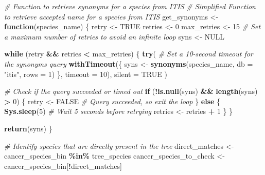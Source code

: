 \documentclass[
]{article}
\newenvironment{Shaded}{\begin{snugshade}}{\end{snugshade}}
\newcommand{\AttributeTok}[1]{\textcolor[rgb]{0.13,0.29,0.53}{#1}}
\newcommand{\CommentTok}[1]{\textcolor[rgb]{0.56,0.35,0.01}{\textit{#1}}}
\newcommand{\ConstantTok}[1]{\textcolor[rgb]{0.56,0.35,0.01}{#1}}
\newcommand{\ControlFlowTok}[1]{\textcolor[rgb]{0.13,0.29,0.53}{\textbf{#1}}}
\newcommand{\DecValTok}[1]{\textcolor[rgb]{0.00,0.00,0.81}{#1}}
\newcommand{\FunctionTok}[1]{\textcolor[rgb]{0.13,0.29,0.53}{\textbf{#1}}}
\newcommand{\NormalTok}[1]{#1}
\newcommand{\OtherTok}[1]{\textcolor[rgb]{0.56,0.35,0.01}{#1}}
\newcommand{\SpecialCharTok}[1]{\textcolor[rgb]{0.81,0.36,0.00}{\textbf{#1}}}
\newcommand{\StringTok}[1]{\textcolor[rgb]{0.31,0.60,0.02}{#1}}
\begin{document}
\begin{Shaded}
\begin{Highlighting}[]
\CommentTok{\# Function to retrieve synonyms for a species from ITIS}
\CommentTok{\# Simplified Function to retrieve accepted name for a species from ITIS}
\NormalTok{get\_synonyms }\OtherTok{\textless{}{-}} \ControlFlowTok{function}\NormalTok{(species\_name) \{}
\NormalTok{  retry }\OtherTok{\textless{}{-}} \ConstantTok{TRUE}
\NormalTok{  retries }\OtherTok{\textless{}{-}} \DecValTok{0}
\NormalTok{  max\_retries }\OtherTok{\textless{}{-}} \DecValTok{15}  \CommentTok{\# Set a maximum number of retries to avoid an infinite loop}
\NormalTok{  syns }\OtherTok{\textless{}{-}} \ConstantTok{NULL}
  
  \ControlFlowTok{while}\NormalTok{ (retry }\SpecialCharTok{\&\&}\NormalTok{ retries }\SpecialCharTok{\textless{}}\NormalTok{ max\_retries) \{}
    \FunctionTok{try}\NormalTok{(}
      \CommentTok{\# Set a 10{-}second timeout for the synonyms query}
      \FunctionTok{withTimeout}\NormalTok{(\{}
\NormalTok{        syns }\OtherTok{\textless{}{-}} \FunctionTok{synonyms}\NormalTok{(species\_name, }\AttributeTok{db =} \StringTok{"itis"}\NormalTok{, }\AttributeTok{rows =} \DecValTok{1}\NormalTok{)}
\NormalTok{      \}, }\AttributeTok{timeout =} \DecValTok{10}\NormalTok{),}
      \AttributeTok{silent =} \ConstantTok{TRUE}
\NormalTok{    )}
    
    \CommentTok{\# Check if the query succeeded or timed out}
    \ControlFlowTok{if}\NormalTok{ (}\SpecialCharTok{!}\FunctionTok{is.null}\NormalTok{(syns) }\SpecialCharTok{\&\&} \FunctionTok{length}\NormalTok{(syns) }\SpecialCharTok{\textgreater{}} \DecValTok{0}\NormalTok{) \{}
\NormalTok{      retry }\OtherTok{\textless{}{-}} \ConstantTok{FALSE}  \CommentTok{\# Query succeeded, so exit the loop}
\NormalTok{    \} }\ControlFlowTok{else}\NormalTok{ \{}
      \FunctionTok{Sys.sleep}\NormalTok{(}\DecValTok{5}\NormalTok{)  }\CommentTok{\# Wait 5 seconds before retrying}
\NormalTok{      retries }\OtherTok{\textless{}{-}}\NormalTok{ retries }\SpecialCharTok{+} \DecValTok{1}
\NormalTok{    \}}
\NormalTok{  \}}
  
  \FunctionTok{return}\NormalTok{(syns)}
\NormalTok{\}}



\CommentTok{\# Identify species that are directly present in the tree}
\NormalTok{direct\_matches }\OtherTok{\textless{}{-}}\NormalTok{ cancer\_species\_bin }\SpecialCharTok{\%in\%}\NormalTok{ tree\_species}
\NormalTok{cancer\_species\_to\_check }\OtherTok{\textless{}{-}}\NormalTok{ cancer\_species\_bin[}\SpecialCharTok{!}\NormalTok{direct\_matches]}


\end{Highlighting}
\end{Shaded}
\end{document}
